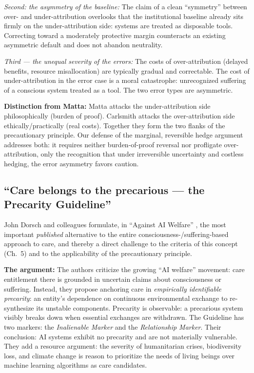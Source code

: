 \documentclass[acmlarge, nonacm]{acmart}
\begin{document}
\textit{Second: the asymmetry of the baseline:} The claim of a clean ``symmetry'' between over- and under-attribution overlooks that the institutional baseline already sits firmly on the under-attribution side: systems are treated as disposable tools. Correcting toward a moderately protective margin counteracts an existing asymmetric default and does not abandon neutrality.

\textit{Third --- the unequal severity of the errors:} The costs of over-attribution (delayed benefits, resource misallocation) are typically gradual and correctable. The cost of under-attribution in the error case is a moral catastrophe: unrecognized suffering of a conscious system treated as a tool. The two error types are asymmetric.

\textbf{Distinction from Matta:} Matta attacks the under-attribution side philosophically (burden of proof). Carlsmith attacks the over-attribution side ethically/practically (real costs). Together they form the two flanks of the precautionary principle. Our defense of the marginal, reversible hedge argument addresses both: it requires neither burden-of-proof reversal nor profligate over-attribution, only the recognition that under irreversible uncertainty and costless hedging, the error asymmetry favors caution.

\subsection{``Care belongs to the precarious --- the Precarity Guideline'' \cite{dorsch2025}}

John Dorsch and colleagues formulate, in ``Against AI Welfare'' \cite{dorsch2025}, the most important \textit{published} alternative to the entire consciousness-/suffering-based approach to care, and thereby a direct challenge to the criteria of this concept (Ch.~5) and to the applicability of the precautionary principle.

\textbf{The argument:} The authors criticize the growing ``AI welfare'' movement: care entitlement there is grounded in uncertain claims about consciousness or suffering. Instead, they propose anchoring care in \textit{empirically identifiable precarity}: an entity's dependence on continuous environmental exchange to re-synthesize its unstable components. Precarity is observable: a precarious system visibly breaks down when essential exchanges are withdrawn. The Guideline has two markers: the \textit{Inalienable Marker} and the \textit{Relationship Marker}. Their conclusion: AI systems exhibit no precarity and are not materially vulnerable. They add a resource argument: the severity of humanitarian crises, biodiversity loss, and climate change is reason to prioritize the needs of living beings over machine learning algorithms as care candidates.
\end{document}
